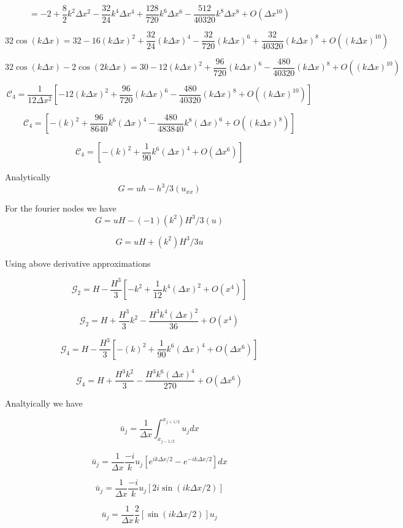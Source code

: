 \documentclass[12pt]{article}
\begin{document}
\[= -2 + \frac{8}{2} k^2 \Delta x^2 - \frac{32}{24} k^4 \Delta x ^4 + \frac{128}{720} k^6 \Delta x ^6 - \frac{512}{40320} k^8 \Delta x^8 + O(\Delta x ^{10})\]

\[32\cos\left(k \Delta x\right) = 32 - 16 (k \Delta x)^2 + \frac{32}{24} (k \Delta x)^4 - \frac{32}{720} (k \Delta x)^6 + \frac{32}{40320} (k \Delta x)^8+ O((k \Delta x)^{10})\]

\[32\cos\left(k \Delta x\right) -2\cos\left(2 k \Delta x\right) = 30 - 12 (k \Delta x)^2  + \frac{96}{720} (k \Delta x)^6 - \frac{480}{40320} (k \Delta x)^8 + O((k \Delta x)^{10})     \]

\[\mathcal{C}_4 = \frac{1 }{12\Delta x^2} \left[- 12 (k \Delta x)^2  + \frac{96}{720} (k \Delta x)^6 - \frac{480}{40320} (k \Delta x)^8 + O((k \Delta x)^{10}) \right]\]

\[\mathcal{C}_4 = \left[- (k)^2  + \frac{96}{8640} k^6(\Delta x)^4 - \frac{480}{483840}k^8 (\Delta x)^6 + O((k \Delta x)^{8}) \right]\]

\[\mathcal{C}_4 = \left[- (k)^2  + \frac{1}{90} k^6(\Delta x)^4 + O(\Delta x^{6}) \right]\]

Analytically 
\[G = uh - h^3/3 (u_{xx})\]

For the fourier nodes we have
\[G = uH - (-1) (k^2) H^3/3 (u)\]

\[G = uH + (k^2) H^3/3 u\]

Using above derivative approximations

\[\mathcal{G}_2 = H -\frac{H^3}{3}\left[- k^2+ \frac{1}{12} k^4(\Delta x)^2 + O(x^{4}) \right] \]

\[\mathcal{G}_2 = H +\frac{H^3}{3} k^2 -\frac{H^3 k^4(\Delta x)^2}{36} + O(x^{4})\]

\[\mathcal{G}_4 = H -\frac{H^3}{3}\left[- (k)^2  + \frac{1}{90} k^6(\Delta x)^4 + O(\Delta x^{6}) \right] \]

\[\mathcal{G}_4 = H + \frac{H^3k^2}{3} -\frac{H^3 k^6 (\Delta x)^4}{270} + O(\Delta x^{6}) \]


Analtyically we have

\[\bar{u}_j = \frac{1}{\Delta x} \int_{x_{j - 1/2}}^{x_{j+ 1/2}} u_j dx\]

\[\bar{u}_j = \frac{1}{\Delta x}  \frac{-i}{k} u_j \left[e^{ik \Delta x/ 2} -e^{-ik \Delta x/ 2}\right] dx\]

\[\bar{u}_j = \frac{1}{\Delta x}  \frac{-i}{k} u_j \left[2i \sin\left(ik \Delta x/ 2\right)\right]\]

\[\bar{u}_j = \frac{1}{\Delta x}  \frac{2}{k} \left[\sin\left(ik \Delta x/ 2\right)\right] u_j\]
\end{document}
